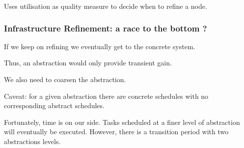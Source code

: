 \documentclass{beamer}
\begin{document}
\begin{frame}
\begin{figure}
  \end{figure}

  Uses utilisation as quality measure to decide when to refine a node.

\end{frame}

\begin{frame}
  \frametitle{ Infrastructure Refinement: a race to the bottom ?}
  
  If we keep on refining we eventually get to the concrete system.
  
  Thus, an abstraction would only provide transient gain.

  \vspace{1ex}

  We also need to \alert{coarsen} the abstraction.

  \vspace{1ex}

  Caveat: for a given abstraction there are concrete schedules with no corresponding abstract schedules.

  \vspace{1ex}

  Fortunately, time is on our side.
  Tasks scheduled at a finer level of abstraction will eventually be executed.
  However, there is a transition period with two abstractions levels.

\end{frame}
\end{document}
